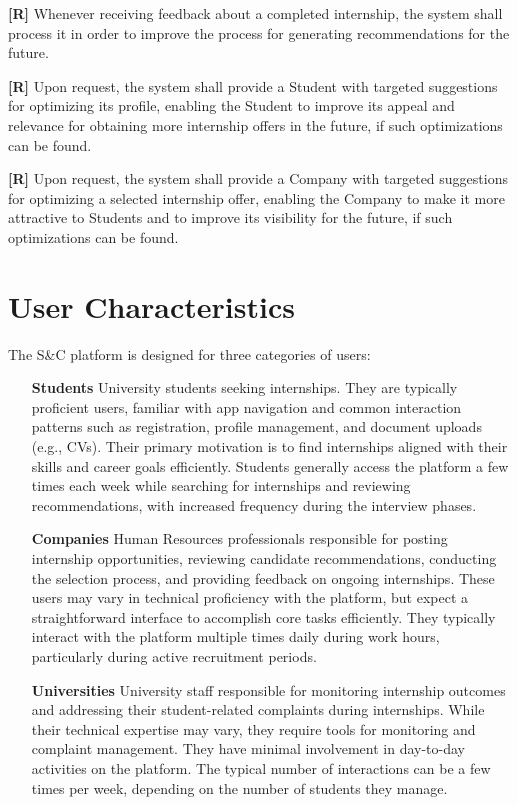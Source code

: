         \textbf{[R\creq]} Whenever receiving feedback about a completed internship, the system shall process it in order to improve the process for generating recommendations for the future.

        \textbf{[R\creq]} Upon request, the system shall provide a Student with targeted suggestions for optimizing its profile, enabling the Student to improve its appeal and relevance for obtaining more internship offers in the future, if such optimizations can be found.

        \textbf{[R\creq]} Upon request, the system shall provide a Company with targeted suggestions for optimizing a selected internship offer, enabling the Company to make it more attractive to Students and to improve its visibility for the future, if such optimizations can be found.
        
\section{User Characteristics}
\label{sec:User_characteristics}%

The S\&C platform is designed for three categories of users:

\begin{itemize}
    \item [\textbf{Students}] University students seeking internships. They are typically proficient users, familiar with app navigation and common interaction patterns such as registration, profile management, and document uploads (e.g., CVs). Their primary motivation is to find internships aligned with their skills and career goals efficiently. Students generally access the platform a few times each week while searching for internships and reviewing recommendations, with increased frequency during the interview phases.
    
    \item [\textbf{Companies}] Human Resources professionals responsible for posting internship opportunities, reviewing candidate recommendations, conducting the selection process, and providing feedback on ongoing internships. These users may vary in technical proficiency with the platform, but expect a straightforward interface to accomplish core tasks efficiently.
    They typically interact with the platform multiple times daily during work hours, particularly during active recruitment periods.
    
    \item [\textbf{Universities}] University staff responsible for monitoring internship outcomes and addressing their student-related complaints during internships. While their technical expertise may vary, they require tools for monitoring and complaint management. They have minimal involvement in day-to-day activities on the platform. The typical number of interactions can be a few times per week, depending on the number of students they manage.
\end{itemize}


